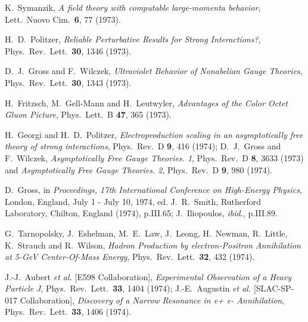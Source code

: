 \documentclass[12pt]{article} %
\begin{document}
\begin{thebibliography}{9}
K.~Symanzik,
{\it A field theory with computable large-momenta behavior},
Lett.\ Nuovo Cim.\  {\bf 6}, 77 (1973).

H.~D.~Politzer,
{\it Reliable Perturbative Results for Strong Interactions?},
  Phys.\ Rev.\ Lett.\  {\bf 30}, 1346 (1973).

D.~J.~Gross and F.~Wilczek,
{\it Ultraviolet Behavior of Nonabelian Gauge Theories},
  Phys.\ Rev.\ Lett.\  {\bf 30}, 1343 (1973).
  
H.~Fritzsch, M.~Gell-Mann and H.~Leutwyler,
{\it Advantages of the Color Octet Gluon Picture},
  Phys.\ Lett.\ B {\bf 47}, 365 (1973).

H.~Georgi and H.~D.~Politzer,
{\it Electroproduction scaling in an asymptotically free theory of strong interactions},
  Phys.\ Rev.\ D {\bf 9}, 416 (1974);
D.~J.~Gross and F.~Wilczek,
{\it Asymptotically Free Gauge Theories. 1},
  Phys.\ Rev.\ D {\bf 8}, 3633 (1973) and
{\it Asymptotically Free Gauge Theories. 2},
  Phys.\ Rev.\ D {\bf 9}, 980 (1974).

D.~Gross, in {\it Proceedings, 17th International Conference on High-Energy Physics}, London, England, July 1 - July 10, 1974,
ed. J.~R.~Smith, Rutherford Laboratory, Chilton, England (1974), p.III.65;
J.~Iliopoulos, {\it ibid.}, p.III.89.

G.~Tarnopolsky, J.~Eshelman, M.~E.~Law, J.~Leong, H.~Newman, R.~Little, K.~Strauch and R.~Wilson,
{\it Hadron Production by electron-Positron Annihilation at 5-GeV Center-Of-Mass Energy},
  Phys.\ Rev.\ Lett.\  {\bf 32}, 432 (1974).

J.-J.~Aubert {\it et al.}  [E598 Collaboration],
{\it Experimental Observation of a Heavy Particle J},
  Phys.\ Rev.\ Lett.\  {\bf 33}, 1404 (1974);
  J.-E.~Augustin {\it et al.}  [SLAC-SP-017 Collaboration],
{\it Discovery of a Narrow Resonance in e+ e- Annihilation},
  Phys.\ Rev.\ Lett.\  {\bf 33}, 1406 (1974).


\end{thebibliography}
\end{document}

